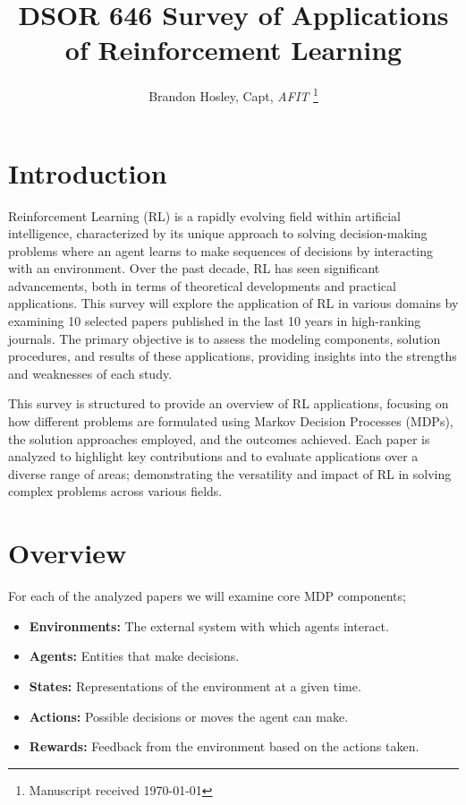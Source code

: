 \documentclass[journal]{IEEEtran}
\title{DSOR 646 Survey of Applications of Reinforcement Learning}
\author{Brandon Hosley, Capt, \textit{AFIT}%
    \thanks{Manuscript received \today%
}}
\begin{document}
\maketitle
\begin{abstract}
\end{abstract}
\section{Introduction}
\label{sec:introduction}

Reinforcement Learning (RL) is a rapidly evolving field within artificial intelligence, 
characterized by its unique approach to solving decision-making problems where an agent 
learns to make sequences of decisions by interacting with an environment. 
Over the past decade, RL has seen significant advancements, 
both in terms of theoretical developments and practical applications. 
This survey will explore the application of RL in various domains by examining 10 
selected papers published in the last 10 years in high-ranking journals. 
The primary objective is to assess the modeling components, solution procedures, and results 
of these applications, providing insights into the strengths and weaknesses of each study.

This survey is structured to provide an overview of RL applications, focusing on how 
different problems are formulated using Markov Decision Processes (MDPs), 
the solution approaches employed, and the outcomes achieved. Each paper is analyzed to 
highlight key contributions and to evaluate applications over a diverse range of areas; 
demonstrating the versatility and impact of RL in solving complex problems across various fields.

\section{Overview}
\label{sec:overview}

For each of the analyzed papers we will examine core MDP components;

\begin{itemize}
    \item \textbf{Environments:} The external system with which agents interact.
    \item \textbf{Agents:} Entities that make decisions.
    \item \textbf{States:} Representations of the environment at a given time.
    \item \textbf{Actions:} Possible decisions or moves the agent can make.
    \item \textbf{Rewards:} Feedback from the environment based on the actions taken.
\end{itemize}
\end{document}

